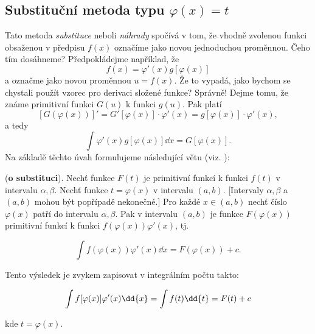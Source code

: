       
  
    \subsection{Substituční metoda typu \(\varphi(x) = t\)}\label{mai:IchapVIIsecIIIssecIII}
      Tato metoda \emph{substituce} neboli \emph{náhrady} spočívá v tom, že vhodně zvolenou funkci
      obsaženou v předpisu \(f(x)\) označíme jako novou jednoduchou proměnnou. Čeho tím dosáhneme?
      Předpokládejme například, že \[f(x)=\varphi'(x)g[\varphi(x)]\] a označme jako novou proměnnou
      \(u = f(x)\). Že to vypadá, jako bychom se chystali použít vzorec pro derivaci složené funkce?
      Správně! Dejme tomu, že známe primitivní funkci \(G(u)\) k funkci \(g(u)\). Pak platí
      \begin{equation*}
        \left[G\left(\varphi(x)\right)\right]' = G'\left[\varphi(x)\right]\cdot\varphi'(x) 
        = g\left[\varphi(x)\right]\cdot\varphi'(x),     
      \end{equation*}
      a tedy
      \begin{equation*}
        \int \varphi'(x) g\left[\varphi(x)\right]\dd{x} =  G\left[\varphi(x)\right]. 
      \end{equation*}      
      Na základě těchto úvah formulujeme následující větu (viz. \cite[p.~142]{diblik2002}):
      \begin{mdframed}[style=mdmathlemma]
        \begin{lemma}\label{mai:lemma009}          
          (\textbf{o substituci}). Nechť funkce \(F(t)\) je primitivní funkcí k funkci \(f(t)\) v
          intervalu \(\alpha, \beta\). Nechť funkce \(t = \varphi(x)\) v intervalu \((a,b)\).
          [Intervaly \(\alpha, \beta\) a \((a,b)\) mohou být popřípadě nekonečné.] Pro každé
          \(x\in(a,b)\) nechť číslo \(\varphi(x)\) patří do intervalu \(\alpha, \beta\). Pak v
          intervalu \((a,b)\) je funkce \(F(\varphi(x))\) primitivní funkcí k funkci
          \(f(\varphi(x))\varphi'(x)\), tj. 
          \begin{fleqn}[0pt]
            \begin{equation}\label{mai:eq176}
              \int{f(\varphi(x))\varphi'(x)\dd{x}} = F(\varphi(x)) + c.
            \end{equation}
          \end{fleqn}
          Tento výsledek je zvykem zapisovat v integrálním počtu takto:
          \begin{fleqn}[0pt]
            \begin{equation}\label{mai:eq177}
              \int{f[\varphi(x)]\varphi'(x)\dd{x}}= \int f(t)\dd{t}= F(t)+c
              \raisetag{14pt}
            \end{equation}
          \end{fleqn}
          kde \(t=\varphi(x)\).
        \end{lemma}
      \end{mdframed}
  
